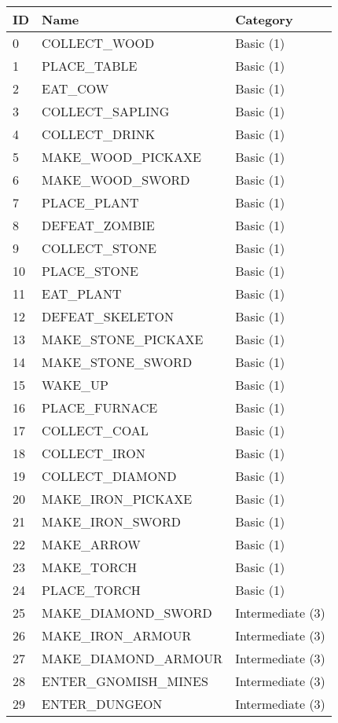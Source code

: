 \documentclass{article}
\theoremstyle{plain}
\theoremstyle{definition}
\theoremstyle{remark}
\begin{document}
\begin{table*}[t]
\centering
\begin{tabular}{@{}l l l@{}} 
    \toprule
    \textbf{ID} & \textbf{Name} & \textbf{Category} \\
    \midrule
    0 & COLLECT\_WOOD & Basic (1)\\
    1 & PLACE\_TABLE & Basic (1)\\
    2 & EAT\_COW & Basic (1)\\
    3 & COLLECT\_SAPLING & Basic (1)\\
    4 & COLLECT\_DRINK & Basic (1)\\
    5 & MAKE\_WOOD\_PICKAXE & Basic (1)\\
    6 & MAKE\_WOOD\_SWORD & Basic (1)\\
    7 & PLACE\_PLANT & Basic (1)\\
    8 & DEFEAT\_ZOMBIE & Basic (1)\\
    9 & COLLECT\_STONE & Basic (1)\\
    10 & PLACE\_STONE & Basic (1)\\
    11 & EAT\_PLANT & Basic (1)\\
    12 & DEFEAT\_SKELETON & Basic (1)\\
    13 & MAKE\_STONE\_PICKAXE & Basic (1)\\
    14 & MAKE\_STONE\_SWORD & Basic (1)\\
    15 & WAKE\_UP & Basic (1)\\
    16 & PLACE\_FURNACE & Basic (1)\\
    17 & COLLECT\_COAL & Basic (1)\\
    18 & COLLECT\_IRON & Basic (1)\\
    19 & COLLECT\_DIAMOND & Basic (1)\\
    20 & MAKE\_IRON\_PICKAXE & Basic (1)\\
    21 & MAKE\_IRON\_SWORD & Basic (1)\\
    22 & MAKE\_ARROW & Basic (1)\\
    23 & MAKE\_TORCH & Basic (1)\\
    24 & PLACE\_TORCH & Basic (1)\\
    25 & MAKE\_DIAMOND\_SWORD & Intermediate (3)\\
    26 & MAKE\_IRON\_ARMOUR & Intermediate (3)\\
    27 & MAKE\_DIAMOND\_ARMOUR & Intermediate (3)\\
    28 & ENTER\_GNOMISH\_MINES & Intermediate (3)\\
    29 & ENTER\_DUNGEON & Intermediate (3)\\

\end{tabular}
\end{table*}
\end{document}
